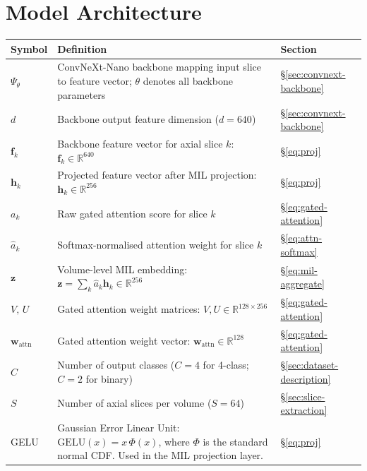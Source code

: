 \section*{Model Architecture}
\begin{center}
\renewcommand{\arraystretch}{1.4}
\begin{tabular}{p{2.8cm} p{9.5cm} p{1.6cm}}
  \hline
  \textbf{Symbol} & \textbf{Definition} & \textbf{Section} \\
  \hline
  $\Psi_\theta$
    & ConvNeXt-Nano backbone mapping input slice to
      feature vector; $\theta$ denotes all backbone
      parameters
    & §\ref{sec:convnext-backbone} \\
  $d$
    & Backbone output feature dimension ($d = 640$)
    & §\ref{sec:convnext-backbone} \\
  $\mathbf{f}_k$
    & Backbone feature vector for axial slice $k$:
      $\mathbf{f}_k \in \mathbb{R}^{640}$
    & §\ref{eq:proj} \\
  $\mathbf{h}_k$
    & Projected feature vector after MIL projection:
      $\mathbf{h}_k \in \mathbb{R}^{256}$
    & §\ref{eq:proj} \\
  $a_k$
    & Raw gated attention score for slice $k$
    & §\ref{eq:gated-attention} \\
  $\hat{a}_k$
    & Softmax-normalised attention weight for slice $k$
    & §\ref{eq:attn-softmax} \\
  $\mathbf{z}$
    & Volume-level MIL embedding:
      $\mathbf{z} = \sum_k \hat{a}_k \mathbf{h}_k
      \in \mathbb{R}^{256}$
    & §\ref{eq:mil-aggregate} \\
  $V,\, U$
    & Gated attention weight matrices:
      $V, U \in \mathbb{R}^{128 \times 256}$
    & §\ref{eq:gated-attention} \\
  $\mathbf{w}_{\mathrm{attn}}$
    & Gated attention weight vector:
      $\mathbf{w}_{\mathrm{attn}} \in \mathbb{R}^{128}$
    & §\ref{eq:gated-attention} \\
  $C$
    & Number of output classes
      ($C=4$ for 4-class; $C=2$ for binary)
    & §\ref{sec:dataset-description} \\
  $S$
    & Number of axial slices per volume ($S = 64$)
    & §\ref{sec:slice-extraction} \\
  GELU
    & Gaussian Error Linear Unit:
      $\mathrm{GELU}(x) = x\,\Phi(x)$, where $\Phi$ is
      the standard normal CDF.
      Used in the MIL projection layer.
    & §\ref{eq:proj} \\
  \hline
\end{tabular}
\end{center}


